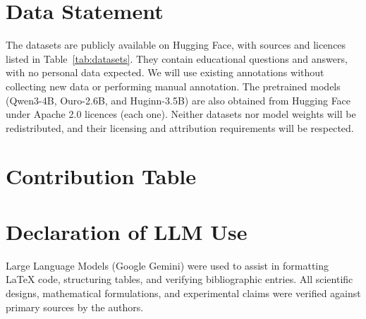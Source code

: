 \documentclass[11pt]{article}
\begin{document}
\section*{Data Statement}
\label{sec:data-statement}
The datasets are publicly available on Hugging Face,
with sources and licences listed in Table~\ref{tab:datasets}.
They contain educational questions and answers,
with no personal data expected.
We will use existing annotations without collecting
new data or performing manual annotation.
The pretrained models (Qwen3-4B, Ouro-2.6B, and
Huginn-3.5B) are also obtained from Hugging Face under Apache 2.0 licences (each one).
Neither datasets nor model weights will be redistributed,
and their licensing and attribution requirements
will be respected.

\section*{Contribution Table}
\begin{center}
\footnotesize
{}
\end{center}

\section*{Declaration of LLM Use}
Large Language Models (Google Gemini) were used to assist in formatting LaTeX code, structuring tables, and verifying bibliographic entries. All scientific designs, mathematical formulations, and experimental claims were verified against primary sources by the authors.



\end{document}
